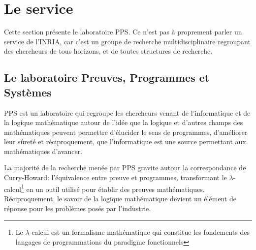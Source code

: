 \documentclass[a4paper, 11pt]{report}
\newcommand{\lc}[0]{$\lambda$-calcul\xspace}
\begin{document}
  \section{Le service}
  Cette section présente le laboratoire PPS. Ce n'est pas à proprement parler
  un service de l'INRIA, car c'est un groupe de recherche multidisciplinaire
  regroupant des chercheurs de tous horizons, et de toutes structures de
  recherche.
    \subsection{Le laboratoire Preuves, Programmes  et Systèmes}
    PPS est un laboratoire qui regroupe les chercheurs venant de l'informatique
    et de la logique mathématique autour de l'idée que la logique et d'autres
    champs des mathématiques peuvent permettre d'élucider le sens de programmes,
    d'améliorer leur sûreté et réciproquement, que l'informatique est une source
    permettant aux mathématiques d'avancer.

    La majorité de la recherche menée par PPS gravite autour la correspondance
    de Curry-Howard: l'équivalence entre preuve et programmes, transformant
    le \lc\footnote{Le \lc{} est un formalisme mathématique
    qui constitue les fondements des langages de programmations du paradigme fonctionnels} en un
    outil utilisé pour établir des preuves mathématiques. Réciproquement, le
    savoir de la logique mathématique devient un élément de réponse pour les
    problèmes posés par l'industrie.
\end{document}
